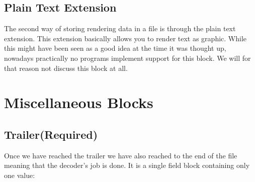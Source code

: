 \begin{algorithm}[H]
\begin{algorithmic}[1]
    \EndIf

    \Else
    \EndIf

    \State {}



    \State {}

    \EndIf
    \EndIf



    \EndWhile

  \end{algorithmic}
\end{algorithm}

\subsection{Plain Text Extension}

The second way of storing rendering data in a \gif file is through the
plain text extension. This extension basically allows you to render
text as graphic. While this might have been seen as a good idea at the
time it was thought up, nowadays practically no programs implement
support for this block. We will for that reason not discuss this
block at all.

\section{Miscellaneous Blocks}

\subsection{Trailer(Required)}

Once we have reached the trailer we have also reached to the end of
the \gif file meaning that the decoder's job is done. It is a single
field block containing only one value:

